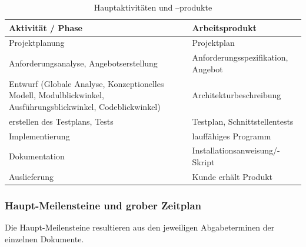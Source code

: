 \documentclass[fontsize=12pt,paper=a4,twoside]{scrartcl}
\begin{document}
\begin{table}[htbp]
\caption{Hauptaktivitäten und --produkte}
\centering
\begin{tabular}{p{7cm}|p{7cm}}
\hline Aktivität / Phase & Arbeitsprodukt \\ \hline
\hline Projektplanung & Projektplan\\
\hline Anforderungsanalyse, Angebotserstellung & Anforderungsspezifikation, Angebot\\
\hline Entwurf (Globale Analyse, Konzeptionelles Modell, Modulblickwinkel, Ausführungsblickwinkel, Codeblickwinkel) & Architekturbeschreibung\\
\hline erstellen des Testplans, Tests & Testplan, Schnittstellentests\\
\hline Implementierung & lauffähiges Programm\\
\hline Dokumentation & Installationsanweisung/-Skript\\
\hline Auslieferung & Kunde erhält Produkt\\
\hline 
\end{tabular}
\end{table}

\newpage

\subsubsection{Haupt-Meilensteine und grober Zeitplan}\label{meilensteine}

Die Haupt-Meilensteine resultieren aus den jeweiligen Abgabeterminen der einzelnen Dokumente.
\end{document}
